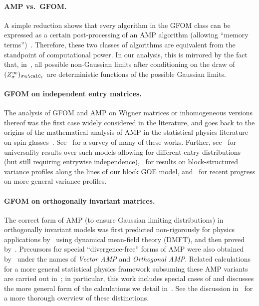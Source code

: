 \paragraph{AMP vs.\ GFOM.}
A simple reduction shows that every algorithm in the GFOM class can be expressed as a certain post-processing of an AMP algorithm (allowing ``memory terms'')~\cite{celentano2020estimation}.
Therefore, these two classes of algorithms are equivalent from the standpoint of computational power.
In our analysis, this is mirrored by the fact that, in~, all possible non-Gaussian limits after conditioning on the draw of $(Z^\infty_{\sigma})_{\sigma\in \calC_1}$ are  deterministic functions of the possible Gaussian limits.

\paragraph{GFOM on independent entry matrices.}
The analysis of GFOM and AMP on Wigner matrices or inhomogeneous versions thereof was the first case widely considered in the literature, and goes back to the origins of the mathematical analysis of AMP in the statistical physics literature on spin glasses~\cite{bolthausen2014iterative,donoho2009message,bayati2011dynamics,montanari2012graphical,barbierSpatial,rush2018finite,LW-2022-NonAsymptoticAMPSpiked}. See~\cite{feng2022unifying} for a survey of many of these works.
Further, see~\cite{bayati2015universality,chen2021universality} for universality results over such models allowing for different entry distributions (but still requiring entrywise independence),~\cite{donoho2013information,javanmard2013state} for results on block-structured variance profiles along the lines of our block GOE model, and~\cite{gueddari2025approximate,bao2025leave} for recent progress on more general variance profiles.

\paragraph{GFOM on orthogonally invariant matrices.} The correct form of AMP (to ensure Gaussian limiting distributions)
in orthogonally invariant models was first predicted non-rigorously for physics applications by~\cite{opper2016theory} using dynamical mean-field theory (DMFT), and then proved by~\cite{fan2022approximate}. Precursors for special ``divergence-free'' forms of AMP were also obtained by~\cite{CO-2019-TAPEquationAMPInvariant,ma2017orthogonal,rangan2019vector,takeuchi2019rigorous} under the names of \emph{Vector AMP} and \emph{Orthogonal AMP}.
Related calculations for a more general statistical physics framework subsuming these AMP variants are carried out in~\cite{MFCKMZ-2019-PlefkaExpansionOrthogonalIsing}; in particular, this work includes special cases of and discusses the more general form of the calculations we detail in~.
See the discussion in~\cite{fan2022approximate} for a more thorough overview of these distinctions.

